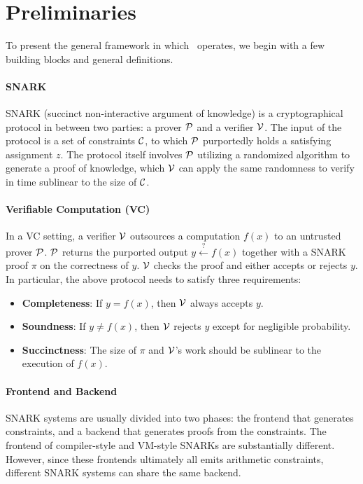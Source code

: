 \section{Preliminaries}
To present the general framework in which \CoBBl~operates, we begin with a few building blocks and general definitions.

\paragraph{SNARK} SNARK (succinct non-interactive argument of knowledge) is a cryptographical protocol in between two parties: a prover $\P$ and a verifier $\V$. The input of the protocol is a set of constraints $\C$, to which $\P$ purportedly holds a satisfying assignment $z$. The protocol itself involves $\P$ utilizing a randomized algorithm to generate a proof of knowledge, which $\V$ can apply the same randomness to verify in time sublinear to the size of $\C$.

\paragraph{Verifiable Computation (VC)} In a VC setting, a verifier $\V$ outsources a computation $f(x)$ to an untrusted prover $\P$. $\P$ returns the purported output $y\xleftarrow{?} f(x)$ together with a SNARK proof $\pi$ on the correctness of $y$. $\V$ checks the proof and either accepts or rejects $y$. In particular, the above protocol needs to satisfy three requirements:
\begin{itemize}
    \item \textbf{Completeness}: If $y=f(x)$, then $\V$ always accepts $y$.
    \item \textbf{Soundness}: If $y\neq f(x)$, then $\V$ rejects $y$ except for negligible probability.
    \item \textbf{Succinctness}: The size of $\pi$ and $\V$'s work should be sublinear to the execution of $f(x)$.
\end{itemize}

\paragraph{Frontend and Backend} SNARK systems are usually divided into two phases: the frontend that generates constraints, and a backend that generates proofs from the constraints. The frontend of compiler-style and VM-style SNARKs are substantially different. However, since these frontends ultimately all emits arithmetic constraints, different SNARK systems can share the same backend.

